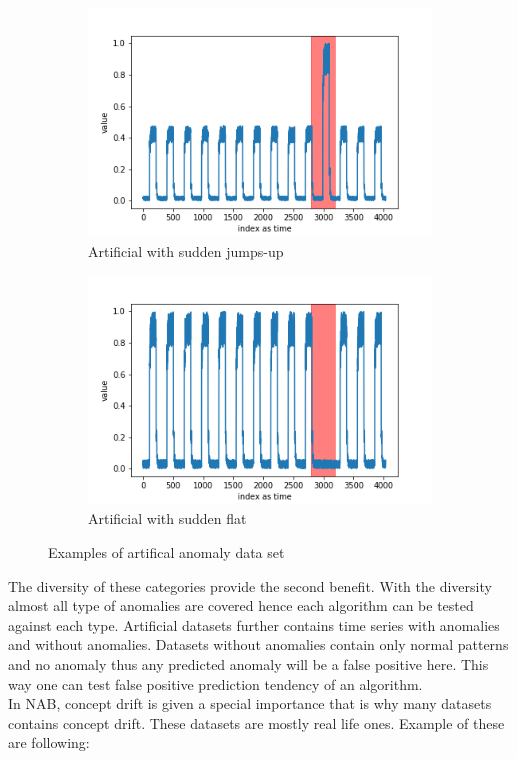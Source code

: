 \documentclass[12pt]{article}
\begin{document}
\begin{figure}[H]
  \begin{subfigure}[t]{0.5\textwidth}
    \centering
    \includegraphics[width=\linewidth]{images/dataAnomalies/artificial/art_daily_jumpsup.png}
    \caption{Artificial with sudden jumps-up}
  \end{subfigure}
  \hfill
  \begin{subfigure}[t]{0.5	\textwidth}
    \centering
    \includegraphics[width=\linewidth]{images/dataAnomalies/artificial/art_daily_nojump.png}
    \caption{Artificial with sudden flat}
  \end{subfigure}
  \caption{Examples of artifical anomaly data set}
  \label{artificialDataPlots}
\end{figure}
The diversity of these categories provide the second benefit. With the diversity almost all type of anomalies are covered hence each algorithm can be tested against each type. Artificial datasets further contains time series with anomalies and without anomalies. Datasets without anomalies contain only normal patterns and no anomaly thus any predicted anomaly will be a false positive here. This way one can test false positive prediction tendency of an algorithm. \\
\break
In NAB, concept drift is given a special importance that is why many datasets contains concept drift. These datasets are mostly real life ones. Example of these are following:
\end{document}
